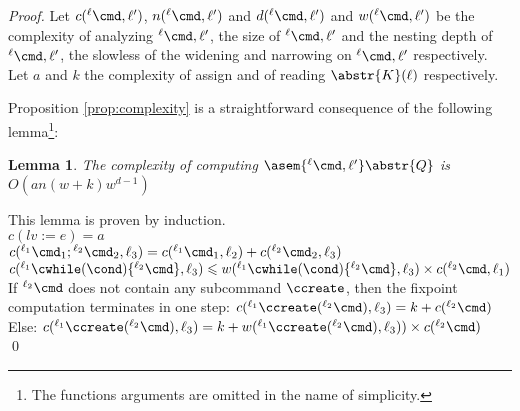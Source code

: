 \documentclass[12pt]{article}
\newcommand{\lab}{  {}^{\ell}}
\newcommand{\li}[1]{ {}^{\ell_{#1}}  }
\newtheorem{lemma}{Lemma}
\begin{document}
\begin{proof}

Let \(c(\lab \cmd,\ell')\), \(n(\lab \cmd,\ell')\) and \(d(\lab \cmd,\ell')\) and \(w(\lab \cmd,\ell')\) be the complexity of analyzing \(\lab \cmd,\ell'\), the size of \(\lab \cmd,\ell'\) and the nesting depth of \(\lab \cmd,\ell'\), the slowless of the widening and narrowing on \(\lab \cmd,\ell'\) respectively. 
Let \(a\) and \(k\) the complexity of assign and of reading \(\abstr{K}(\ell)\) respectively.

Proposition \ref{prop:complexity} is a straightforward consequence of the following lemma\footnote{The functions arguments are omitted in the name of simplicity.}:
\begin{lemma}
 The complexity of computing \(\asem{\lab \cmd,\ell'}\abstr{Q}\) is \(O(an(w+k)w^{d-1})\)
\end{lemma}

This lemma is proven by induction.\\
\(c(lv:=e) = a \)\\
\(c(\li1\cmd_1;\li2\cmd_2,\ell_3)=c(\li1\cmd_1,\ell_2)+c(\li2\cmd_2,\ell_3)\)\\
\(c(\li1\cwhile(\cond)\{\li2\cmd\},\ell_3) \leqslant w(\li1\cwhile(\cond)\{\li2\cmd\},\ell_3) \times c(\li2\cmd,\ell_1) \)\\

If \(\li2 \cmd\) does not contain any subcommand \(\ccreate\), then the fixpoint computation terminates in one step: 
\(c(\li1\ccreate(\li2 \cmd),\ell_3) = k + c(\li2 \cmd)\)\\
Else: 
\(c(\li1\ccreate(\li2 \cmd),\ell_3) = k + w(\li1\ccreate(\li2 \cmd),\ell_3)) \times c(\li2 \cmd)\)
\qed
\end{proof}
\end{document}
